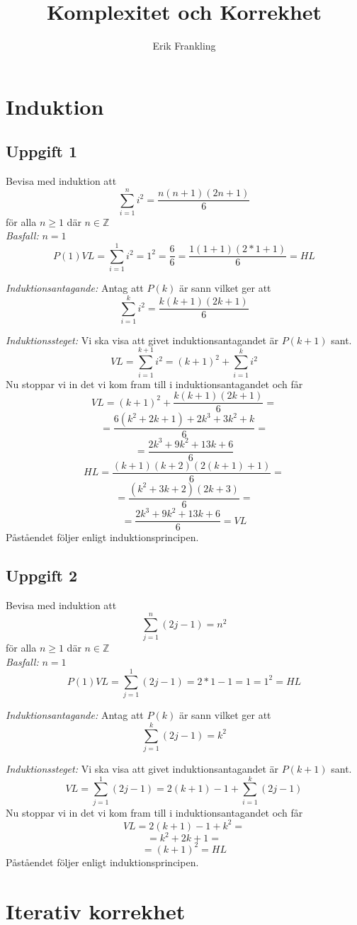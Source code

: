 \documentclass{article}
\title{Komplexitet och Korrekhet}
\author{Erik Frankling}
\begin{document}
\section{Induktion}
\subsection{Uppgift 1}
Bevisa med induktion att 
\[ \sum_{i=1}^{n} i ^ 2 = \frac{n (n + 1) (2n + 1)}{6} \] 
för alla $n \ge 1$ där $n \in \mathbb{Z}$\\


\textit{Basfall:} $n = 1$
\[ P(1) VL = \sum_{i=1}^{1} i ^ 2  = 1 ^ 2 = \frac{6}{6} = \frac{1 (1 + 1) (2 * 1 + 1)}{6} = HL \]

\textit{Induktionsantagande:} Antag att $P(k)$ är sann vilket ger att 
\[ \sum_{i=1}^{k} i ^ 2 = \frac{k (k + 1) (2k + 1)}{6} \]

\textit{Induktionssteget:}
Vi ska visa att givet induktionsantagandet är $P(k + 1)$ sant.
\[ VL = \sum_{i=1}^{k + 1} i ^ 2 = (k + 1) ^ 2 + \sum_{i=1}^{k} i ^ 2 \]
Nu stoppar vi in det vi kom fram till i induktionsantagandet och får
\[ VL = (k + 1) ^ 2 + \frac{k (k + 1) (2k + 1)}{6} = \]
\[ = \frac{ 6 (k ^ 2 + 2k + 1) + 2k ^ 3 + 3k ^ 2 + k}{6} = \]
\[ = \frac{ 2k ^ 3 + 9k ^ 2 + 13k + 6 }{6}\]
\[ HL = \frac{(k + 1) (k + 2) (2 (k + 1) + 1)}{6} = \]
\[ = \frac{(k ^ 2 + 3k + 2) (2k + 3)}{6} = \]
\[ = \frac{2k ^ 3 + 9k ^ 2 + 13k + 6}{6} = VL \]
Påståendet följer enligt induktionsprincipen.

\subsection{Uppgift 2}
Bevisa med induktion att 
\[ \sum_{j=1}^{n} (2j - 1) = n ^ 2 \]
för alla $n \ge 1$ där $n \in \mathbb{Z}$\\


\textit{Basfall:} $n = 1$
\[ P(1) VL = \sum_{j=1}^{1} (2j - 1)  = 2 * 1 - 1 = 1 = 1 ^ 2 = HL \]

\textit{Induktionsantagande:} Antag att $P(k)$ är sann vilket ger att 
\[ \sum_{j=1}^{k} (2j - 1) = k ^ 2 \]

\textit{Induktionssteget:}
Vi ska visa att givet induktionsantagandet är $P(k + 1)$ sant.
\[ VL = \sum_{j=1}^{1} (2j - 1) = 2 (k + 1) - 1 + \sum_{i=1}^{k} (2j - 1) \]
Nu stoppar vi in det vi kom fram till i induktionsantagandet och får
\[ VL = 2 (k + 1) - 1 + k ^ 2 = \]
\[ = k ^ 2 + 2k + 1 = \]
\[ = (k + 1) ^ 2 = HL \]
Påståendet följer enligt induktionsprincipen.
\section{Iterativ korrekhet}
\end{document}

